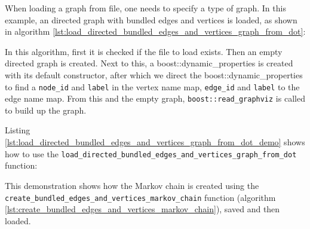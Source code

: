 When loading a graph from file, one needs to specify a type of graph.
In this example, an directed graph with bundled edges and vertices is loaded,
as shown in algorithm \ref{lst:load_directed_bundled_edges_and_vertices_graph_from_dot}:



In this algorithm, first it is checked if the file to load exists.
Then an empty directed graph is created.
Next to this, a boost::dynamic\_properties 
is created with its default constructor, after which we direct the 
boost::dynamic_properties 
to find a \verb;node_id; and \verb;label; in the vertex name map, 
\verb;edge_id; and \verb;label; to the edge name map.
 From this and the empty graph, \verb;boost::read_graphviz;
is called to build up the graph.

Listing 
\ref{lst:load_directed_bundled_edges_and_vertices_graph_from_dot_demo}
shows how to use the \verb;load_directed_bundled_edges_and_vertices_graph_from_dot;
function:



This demonstration shows how the Markov chain is created using 
the \verb;create_bundled_edges_and_vertices_markov_chain; function 
(algorithm \ref{lst:create_bundled_edges_and_vertices_markov_chain}), 
saved and then loaded.

